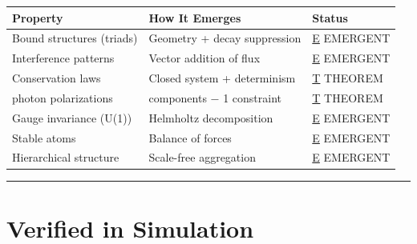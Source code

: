 \documentclass[
  11pt,
  letterpaper,
  twoside,
  openright]{book}
\begin{document}
\begin{longtable}[]{@{}
  >{\raggedright\arraybackslash}p{}
  >{\raggedright\arraybackslash}p{}
  >{\raggedright\arraybackslash}p{}@{}}
\toprule\noalign{}
\begin{minipage}[b]{\linewidth}\raggedright
Property
\end{minipage} & \begin{minipage}[b]{\linewidth}\raggedright
How It Emerges
\end{minipage} & \begin{minipage}[b]{\linewidth}\raggedright
Status
\end{minipage} \\
\midrule\noalign{}
\endhead
\bottomrule\noalign{}
\endlastfoot
Bound structures (triads) & Geometry + decay suppression &
\hyperref[e]{E} EMERGENT \\
Interference patterns & Vector addition of flux & \hyperref[e]{E}
EMERGENT \\
Conservation laws & Closed system + determinism & \hyperref[t]{T}
THEOREM \\
2 photon polarizations & 3 components − 1 constraint & \hyperref[t]{T}
THEOREM \\
Gauge invariance (U(1)) & Helmholtz decomposition & \hyperref[e]{E}
EMERGENT \\
Stable atoms & Balance of forces & \hyperref[e]{E} EMERGENT \\
Hierarchical structure & Scale-free aggregation & \hyperref[e]{E}
EMERGENT \\
\end{longtable}

\begin{center}\rule{0.5\linewidth}{0.5pt}\end{center}

\section{Verified in Simulation}\label{verified-in-simulation}
\end{document}
